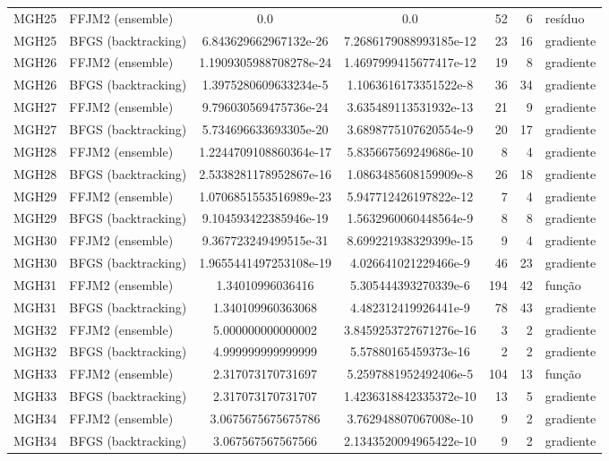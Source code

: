 \documentclass[11pt]{article}
\begin{document}
\begin{longtable}{l l S[table-format=1.3e2] S[table-format=1.3e2] r r l}
\midrule
MGH25 & FFJM2 (ensemble) & 0.0 & 0.0 & 52 & 6 & res\'iduo \\
MGH25 & BFGS (backtracking) & 6.843629662967132e-26 & 7.2686179088993185e-12 & 23 & 16 & gradiente \\
\midrule
MGH26 & FFJM2 (ensemble) & 1.1909305988708278e-24 & 1.4697999415677417e-12 & 19 & 8 & gradiente \\
MGH26 & BFGS (backtracking) & 1.3975280609633234e-5 & 1.1063616173351522e-8 & 36 & 34 & gradiente \\
\midrule
MGH27 & FFJM2 (ensemble) & 9.796030569475736e-24 & 3.635489113531932e-13 & 21 & 9 & gradiente \\
MGH27 & BFGS (backtracking) & 5.734696633693305e-20 & 3.6898775107620554e-9 & 20 & 17 & gradiente \\
\midrule
MGH28 & FFJM2 (ensemble) & 1.2244709108860364e-17 & 5.835667569249686e-10 & 8 & 4 & gradiente \\
MGH28 & BFGS (backtracking) & 2.5338281178952867e-16 & 1.0863485608159909e-8 & 26 & 18 & gradiente \\
\midrule
MGH29 & FFJM2 (ensemble) & 1.0706851553516989e-23 & 5.947712426197822e-12 & 7 & 4 & gradiente \\
MGH29 & BFGS (backtracking) & 9.104593422385946e-19 & 1.5632960060448564e-9 & 8 & 8 & gradiente \\
\midrule
MGH30 & FFJM2 (ensemble) & 9.367723249499515e-31 & 8.699221938329399e-15 & 9 & 4 & gradiente \\
MGH30 & BFGS (backtracking) & 1.9655441497253108e-19 & 4.026641021229466e-9 & 46 & 23 & gradiente \\
\midrule
MGH31 & FFJM2 (ensemble) & 1.34010996036416 & 5.305444393270339e-6 & 194 & 42 & fun\c{c}\~ao \\
MGH31 & BFGS (backtracking) & 1.340109960363068 & 4.482312419926441e-9 & 78 & 43 & gradiente \\
\midrule
MGH32 & FFJM2 (ensemble) & 5.000000000000002 & 3.8459253727671276e-16 & 3 & 2 & gradiente \\
MGH32 & BFGS (backtracking) & 4.999999999999999 & 5.57880165459373e-16 & 2 & 2 & gradiente \\
\midrule
MGH33 & FFJM2 (ensemble) & 2.317073170731697 & 5.2597881952492406e-5 & 104 & 13 & fun\c{c}\~ao \\
MGH33 & BFGS (backtracking) & 2.317073170731707 & 1.4236318842335372e-10 & 13 & 5 & gradiente \\
\midrule
MGH34 & FFJM2 (ensemble) & 3.0675675675675786 & 3.762948807067008e-10 & 9 & 2 & gradiente \\
MGH34 & BFGS (backtracking) & 3.067567567567566 & 2.1343520094965422e-10 & 9 & 2 & gradiente \\
\end{longtable}
\end{document}

